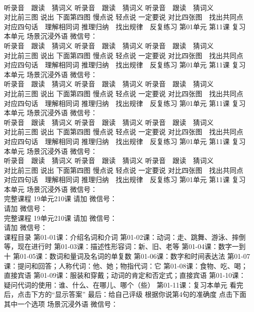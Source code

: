 \documentclass[8pt]{extreport}
\begin{document}
\begin{CJK}{UTF8}{min}
\\	听录音　跟读　猜词义 听录音　跟读　猜词义 听录音　跟读　猜词义 
\\	对比前三图 说出 下面第四图 慢点说 轻点说 一定要说	对比四张图　找出共同点 对应四句话　理解相同词 推理归纳　找出规律　反复练习 第01单元 第11课 复习本单元 场景沉浸外语 微信号：
\\	听录音　跟读　猜词义 听录音　跟读　猜词义 听录音　跟读　猜词义 
\\	对比前三图 说出 下面第四图 慢点说 轻点说 一定要说	对比四张图　找出共同点 对应四句话　理解相同词 推理归纳　找出规律　反复练习 第01单元 第11课 复习本单元 场景沉浸外语 微信号：
\\	听录音　跟读　猜词义 听录音　跟读　猜词义 听录音　跟读　猜词义 
\\	对比前三图 说出 下面第四图 慢点说 轻点说 一定要说	对比四张图　找出共同点 对应四句话　理解相同词 推理归纳　找出规律　反复练习 第01单元 第11课 复习本单元 场景沉浸外语 微信号：
\\	听录音　跟读　猜词义 听录音　跟读　猜词义 听录音　跟读　猜词义 
\\	对比前三图 说出 下面第四图 慢点说 轻点说 一定要说	对比四张图　找出共同点 对应四句话　理解相同词 推理归纳　找出规律　反复练习 第01单元 第11课 复习本单元 场景沉浸外语 微信号：
\\	听录音　跟读　猜词义 听录音　跟读　猜词义 听录音　跟读　猜词义 
\\	对比前三图 说出 下面第四图 慢点说 轻点说 一定要说	对比四张图　找出共同点 对应四句话　理解相同词 推理归纳　找出规律　反复练习 第01单元 第11课 复习本单元 场景沉浸外语 微信号：
\\	完整课程 19单元210课 请加 微信号：
\\	请加 微信号：
\\	完整课程 19单元210课 请加 微信号：
\\	请加 微信号：
\\	课程目录 第01-01课：介绍名词和介词 第01-02课：动词：走、跳舞、游泳、摔倒等，现在进行时 第01-03课：描述性形容词：新、旧、老等 第01-04课：数字一到十 第01-05课：数词和量词及名词的单复数 第01-06课：数字和时间表达法 第01-07课：提问和回答；人称代词：他、她；物指代词：它 第01-08课：食物、吃、喝；直接宾语 第01-09课：服装和穿戴；动词的肯定和否定式；直接宾语 第01-10课：疑问代词的使用：谁、什么、在哪儿、哪个（些） 第01-11课：复习本单元 看完后，点击下方的“显示答案”	最后：给自己评级 根据你说第4句的准确度 点击下面其中一个选项 场景沉浸外语 微信号：
\end{CJK}
\end{document}
